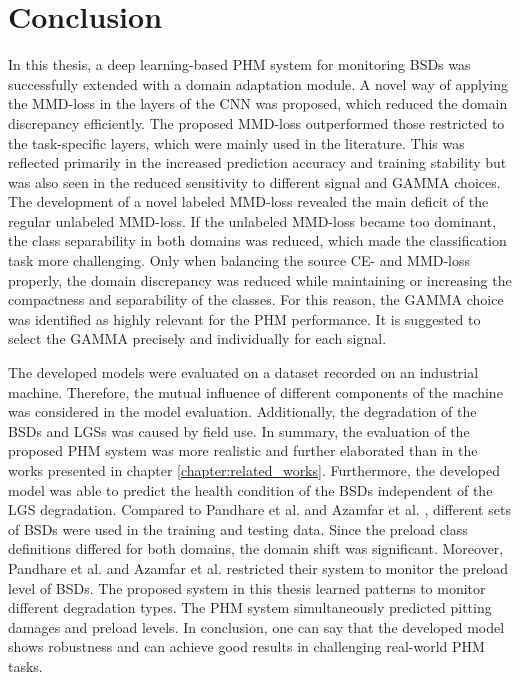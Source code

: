 \chapter{Conclusion}\label{chapter:conclusion}

In this thesis, a deep learning-based PHM system for monitoring BSDs was successfully extended with a domain adaptation module. A novel way of applying the MMD-loss in the layers of the CNN was proposed, which reduced the domain discrepancy efficiently. The proposed MMD-loss outperformed those restricted to the task-specific layers, which were mainly used in the literature. This was reflected primarily in the increased prediction accuracy and training stability but was also seen in the reduced sensitivity to different signal and GAMMA choices. The development of a novel labeled MMD-loss revealed the main deficit of the regular unlabeled MMD-loss. If the unlabeled MMD-loss became too dominant, the class separability in both domains was reduced, which made the classification task more challenging. Only when balancing the source CE- and MMD-loss properly, the domain discrepancy was reduced while maintaining or increasing the compactness and separability of the classes. For this reason, the GAMMA choice was identified as highly relevant for the PHM performance. It is suggested to select the GAMMA precisely and individually for each signal.

The developed models were evaluated on a dataset recorded on an industrial machine. Therefore, the mutual influence of different components of the machine was considered in the model evaluation. Additionally, the degradation of the BSDs and LGSs was caused by field use. In summary, the evaluation of the proposed PHM system was more realistic and further elaborated than in the works presented in chapter \ref{chapter:related_works}. Furthermore, the developed model was able to predict the health condition of the BSDs independent of the LGS degradation. Compared to Pandhare et al. \cite{Pandhare2021} and Azamfar et al. \cite{AZAMFAR2020103932}, different sets of BSDs were used in the training and testing data. Since the preload class definitions differed for both domains, the domain shift was significant. Moreover, Pandhare et al. \cite{Pandhare2021} and Azamfar et al. \cite{AZAMFAR2020103932} restricted their system to monitor the preload level of BSDs. The proposed system in this thesis learned patterns to monitor different degradation types. The PHM system simultaneously predicted pitting damages and preload levels. In conclusion, one can say that the developed model shows robustness and can achieve good results in challenging real-world PHM tasks.